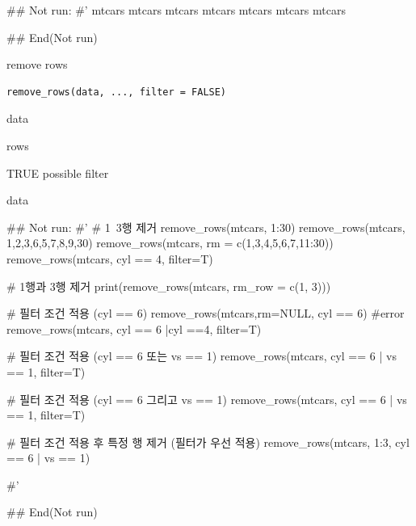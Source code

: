 \documentclass[a4paper]{book}
\begin{document}
%
\begin{Examples}
\begin{ExampleCode}

## Not run: 
#'
mtcars %
mtcars %
mtcars %
mtcars %
mtcars %
mtcars %
mtcars %

## End(Not run)

\end{ExampleCode}
\end{Examples}
%
\begin{Description}
remove rows
\end{Description}
%
\begin{Usage}
\begin{verbatim}
remove_rows(data, ..., filter = FALSE)
\end{verbatim}
\end{Usage}
%
\begin{Arguments}
\begin{ldescription}
\item[\code{data}] data

\item[\code{...}] rows

\item[\code{filter}] TRUE possible filter
\end{ldescription}
\end{Arguments}
%
\begin{Value}
data
\end{Value}
%
\begin{Examples}
\begin{ExampleCode}

## Not run: 
#'
# 1~3행 제거
remove_rows(mtcars,  1:30)
remove_rows(mtcars, 1,2,3,6,5,7,8,9,30)
remove_rows(mtcars, rm = c(1,3,4,5,6,7,11:30))
remove_rows(mtcars, cyl == 4, filter=T)

# 1행과 3행 제거
print(remove_rows(mtcars, rm_row = c(1, 3)))

# 필터 조건 적용 (cyl == 6)
remove_rows(mtcars,rm=NULL, cyl == 6) #error
remove_rows(mtcars, cyl == 6 |cyl ==4, filter=T)

# 필터 조건 적용 (cyl == 6 또는 vs == 1)
remove_rows(mtcars, cyl == 6 | vs == 1, filter=T)

# 필터 조건 적용 (cyl == 6 그리고 vs == 1)
remove_rows(mtcars, cyl == 6 | vs == 1, filter=T)

# 필터 조건 적용 후 특정 행 제거 (필터가 우선 적용)
remove_rows(mtcars, 1:3, cyl == 6 | vs == 1)

#'

## End(Not run)


\end{ExampleCode}
\end{Examples}
\end{document}
